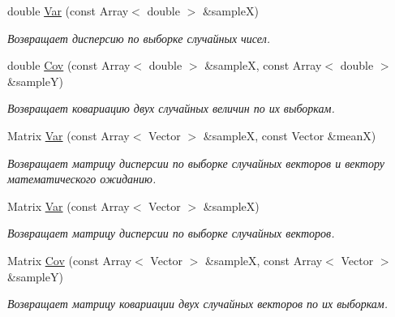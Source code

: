 \begin{DoxyCompactItemize}
double \hyperlink{namespace_math_1_1_statistic_a4fa57184d4396f0f85cf07d8d1f80d19}{Var} (const Array$<$ double $>$ \&sampleX)
\begin{DoxyCompactList}\small\item\em Возвращает дисперсию по выборке случайных чисел. \end{DoxyCompactList}\item 
\hypertarget{namespace_math_1_1_statistic_a82c94ccceb182ae0c07623a0d3e07269}{}\label{namespace_math_1_1_statistic_a82c94ccceb182ae0c07623a0d3e07269} 
double \hyperlink{namespace_math_1_1_statistic_a82c94ccceb182ae0c07623a0d3e07269}{Cov} (const Array$<$ double $>$ \&sampleX, const Array$<$ double $>$ \&sampleY)
\begin{DoxyCompactList}\small\item\em Возвращает ковариацию двух случайных величин по их выборкам. \end{DoxyCompactList}\item 
\hypertarget{namespace_math_1_1_statistic_ac7aadd8aab31379cc285d74a5f30e1bf}{}\label{namespace_math_1_1_statistic_ac7aadd8aab31379cc285d74a5f30e1bf} 
Matrix \hyperlink{namespace_math_1_1_statistic_ac7aadd8aab31379cc285d74a5f30e1bf}{Var} (const Array$<$ Vector $>$ \&sampleX, const Vector \&meanX)
\begin{DoxyCompactList}\small\item\em Возвращает матрицу дисперсии по выборке случайных векторов и вектору математического ожиданию. \end{DoxyCompactList}\item 
\hypertarget{namespace_math_1_1_statistic_af18d9a832496607b0be9a47cc2349e00}{}\label{namespace_math_1_1_statistic_af18d9a832496607b0be9a47cc2349e00} 
Matrix \hyperlink{namespace_math_1_1_statistic_af18d9a832496607b0be9a47cc2349e00}{Var} (const Array$<$ Vector $>$ \&sampleX)
\begin{DoxyCompactList}\small\item\em Возвращает матрицу дисперсии по выборке случайных векторов. \end{DoxyCompactList}\item 
\hypertarget{namespace_math_1_1_statistic_a10cb1e6659e27127bd4b7d2ca19deb37}{}\label{namespace_math_1_1_statistic_a10cb1e6659e27127bd4b7d2ca19deb37} 
Matrix \hyperlink{namespace_math_1_1_statistic_a10cb1e6659e27127bd4b7d2ca19deb37}{Cov} (const Array$<$ Vector $>$ \&sampleX, const Array$<$ Vector $>$ \&sampleY)
\begin{DoxyCompactList}\small\item\em Возвращает матрицу ковариации двух случайных векторов по их выборкам. \end{DoxyCompactList}\item 

\end{DoxyCompactItemize}
